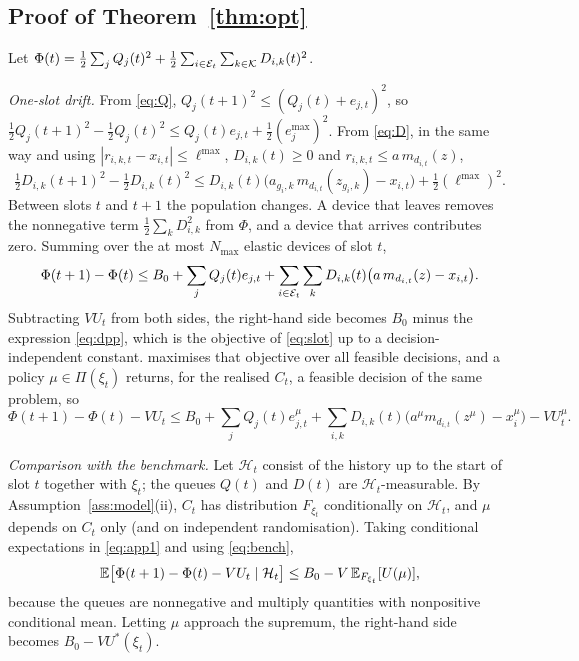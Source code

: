 \subsection{Proof of Theorem~\ref{thm:opt}}\label{app:opt}

Let $\Phi(t)=\tfrac12\sum_jQ_j(t)^2+\tfrac12\sum_{i\in\mathcal{E}_t}\sum_{k\in\mathcal{K}}D_{i,k}(t)^2$.

\emph{One-slot drift.}
From \eqref{eq:Q}, $Q_j(t+1)^2\le(Q_j(t)+e_{j,t})^2$, so
$\tfrac12Q_j(t+1)^2-\tfrac12Q_j(t)^2\le Q_j(t)e_{j,t}+\tfrac12(e_j^{\max})^2$.
From \eqref{eq:D}, in the same way and using $|r_{i,k,t}-x_{i,t}|\le\ell^{\max}$, $D_{i,k}(t)\ge0$ and $r_{i,k,t}\le a\,m_{d_{i,t}}(z)$,
\[
\tfrac12D_{i,k}(t+1)^2-\tfrac12D_{i,k}(t)^2\le D_{i,k}(t)\big(a_{g_i,k}\,m_{d_{i,t}}(z_{g_i,k})-x_{i,t}\big)+\tfrac12(\ell^{\max})^2 .
\]
Between slots $t$ and $t+1$ the population changes. A device that leaves removes the nonnegative term $\tfrac12\sum_kD_{i,k}^2$ from $\Phi$, and a device that arrives contributes zero. Summing over the at most $N_{\max}$ elastic devices of slot $t$,
\[
\Phi(t+1)-\Phi(t)\le B_0+\sum_jQ_j(t)e_{j,t}+\sum_{i\in\mathcal{E}_t}\sum_kD_{i,k}(t)\big(a\,m_{d_{i,t}}(z)-x_{i,t}\big).
\]
Subtracting $VU_t$ from both sides, the right-hand side becomes $B_0$ minus the expression \eqref{eq:dpp}, which is the objective of \eqref{eq:slot} up to a decision-independent constant. \repay{} maximises that objective over all feasible decisions, and a policy $\mu\in\Pi(\xi_t)$ returns, for the realised $C_t$, a feasible decision of the same problem, so
\begin{equation}\label{eq:app1}
\Phi(t+1)-\Phi(t)-VU_t\le B_0+\sum_jQ_j(t)e^{\mu}_{j,t}+\sum_{i,k}D_{i,k}(t)\big(a^\mu m_{d_{i,t}}(z^\mu)-x^\mu_{i}\big)-VU^{\mu}_t .
\end{equation}

\emph{Comparison with the benchmark.}
Let $\mathcal H_t$ consist of the history up to the start of slot $t$ together with $\xi_t$; the queues $Q(t)$ and $D(t)$ are $\mathcal H_t$-measurable.
By Assumption~\ref{ass:model}(ii), $C_t$ has distribution $F_{\xi_t}$ conditionally on $\mathcal H_t$, and $\mu$ depends on $C_t$ only (and on independent randomisation).
Taking conditional expectations in \eqref{eq:app1} and using \eqref{eq:bench},
\[
\mathbb{E}\big[\Phi(t+1)-\Phi(t)-VU_t\mid\mathcal H_t\big]\le B_0-V\,\mathbb{E}_{F_{\xi_t}}[U(\mu)],
\]
because the queues are nonnegative and multiply quantities with nonpositive conditional mean.
Letting $\mu$ approach the supremum, the right-hand side becomes $B_0-VU^*(\xi_t)$.

